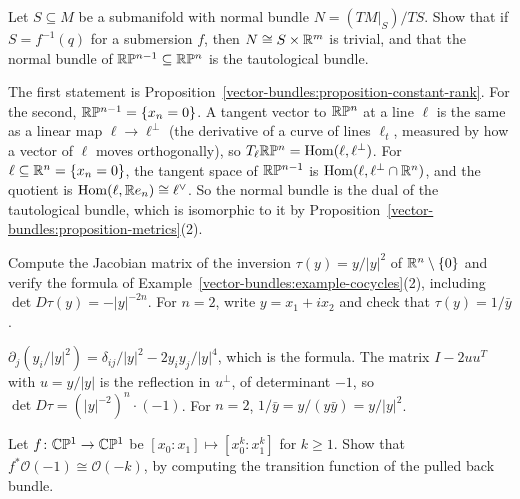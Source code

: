 \begin{exercise}\label{vector-bundles:exercise-normal-bundle}
Let $S \subseteq M$ be a submanifold with normal bundle $N = (TM|_S)/TS$. Show that if $S = f^{-1}(q)$ for a submersion $f$, then $N \cong S \times \mathbb{R}^m$ is trivial, and that the normal bundle of
$\mathbb{R}\mathbb{P}^{n-1} \subseteq \mathbb{R}\mathbb{P}^n$ is the tautological bundle.
\end{exercise}

\begin{solution}
The first statement is Proposition~\ref{vector-bundles:proposition-constant-rank}. For the second, $\mathbb{R}\mathbb{P}^{n-1} = \{x_n = 0\}$. A tangent vector to $\mathbb{R}\mathbb{P}^n$ at a line $\ell$ is the same as a
linear map $\ell \to \ell^\perp$ (the derivative of a curve of lines $\ell_t$, measured by how a vector of $\ell$ moves orthogonally), so $T_\ell\mathbb{R}\mathbb{P}^n = \operatorname{Hom}(\ell, \ell^\perp)$. For
$\ell \subseteq \mathbb{R}^n = \{x_n = 0\}$, the tangent space of $\mathbb{R}\mathbb{P}^{n-1}$ is $\operatorname{Hom}(\ell, \ell^\perp \cap \mathbb{R}^n)$, and the quotient is $\operatorname{Hom}(\ell, \mathbb{R} e_n) \cong \ell^\vee$. So the normal bundle is the
dual of the tautological bundle, which is isomorphic to it by Proposition~\ref{vector-bundles:proposition-metrics}(2).
\end{solution}

\begin{exercise}\label{vector-bundles:exercise-inversion-jacobian}
Compute the Jacobian matrix of the inversion $\tau(y) = y/|y|^2$ of $\mathbb{R}^n \setminus \{0\}$ and verify the formula of Example~\ref{vector-bundles:example-cocycles}(2), including
$\det D\tau(y) = -|y|^{-2n}$. For $n = 2$, write $y = x_1 + ix_2$ and check that $\tau(y) = 1/\bar y$.
\end{exercise}

\begin{solution}
$\partial_j(y_i/|y|^2) = \delta_{ij}/|y|^2 - 2y_iy_j/|y|^4$, which is the formula. The matrix $I - 2uu^T$ with $u = y/|y|$ is the reflection in $u^\perp$, of determinant $-1$, so
$\det D\tau = (|y|^{-2})^n \cdot (-1)$. For $n = 2$, $1/\bar y = y/(y\bar y) = y/|y|^2$.
\end{solution}

\begin{exercise}\label{vector-bundles:exercise-pullback-degree}
Let $f \colon \mathbb{C}\mathbb{P}^1 \to \mathbb{C}\mathbb{P}^1$ be $[x_0 : x_1] \mapsto [x_0^k : x_1^k]$ for $k \geq 1$. Show that $f^*\mathcal{O}(-1) \cong \mathcal{O}(-k)$, by computing the transition function of the
pulled back bundle.
\end{exercise}

